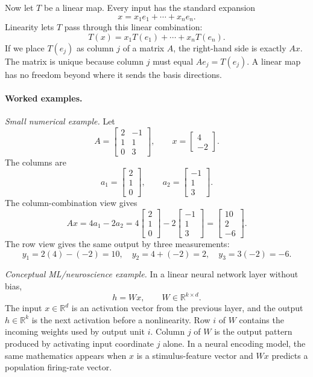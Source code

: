 Now let \(T\) be a linear map. Every input has the standard expansion
\[
x=x_1e_1+\cdots+x_ne_n.
\]
Linearity lets \(T\) pass through this linear combination:
\[
T(x)=x_1T(e_1)+\cdots+x_nT(e_n).
\]
If we place \(T(e_j)\) as column \(j\) of a matrix \(A\), the right-hand side is exactly \(Ax\). The matrix is unique because column \(j\) must equal \(Ae_j=T(e_j)\). A linear map has no freedom beyond where it sends the basis directions.

\paragraph{Worked examples.}
\emph{Small numerical example.} Let
\[
A=
\begin{bmatrix}
2 & -1\\
1 & 1\\
0 & 3
\end{bmatrix},
\qquad
x=\begin{bmatrix}4\\-2\end{bmatrix}.
\]
The columns are
\[
a_1=\begin{bmatrix}2\\1\\0\end{bmatrix},
\qquad
a_2=\begin{bmatrix}-1\\1\\3\end{bmatrix}.
\]
The column-combination view gives
\[
Ax=4a_1-2a_2
=
4\begin{bmatrix}2\\1\\0\end{bmatrix}
-2\begin{bmatrix}-1\\1\\3\end{bmatrix}
=
\begin{bmatrix}10\\2\\-6\end{bmatrix}.
\]
The row view gives the same output by three measurements:
\[
y_1=2(4)-(-2)=10,\quad
y_2=4+(-2)=2,\quad
y_3=3(-2)=-6.
\]

\emph{Conceptual ML/neuroscience example.} In a linear neural network layer without bias,
\[
h=Wx,
\qquad W\in\mathbb{R}^{k\times d}.
\]
The input \(x\in\mathbb{R}^d\) is an activation vector from the previous layer, and the output \(h\in\mathbb{R}^k\) is the next activation before a nonlinearity. Row \(i\) of \(W\) contains the incoming weights used by output unit \(i\). Column \(j\) of \(W\) is the output pattern produced by activating input coordinate \(j\) alone. In a neural encoding model, the same mathematics appears when \(x\) is a stimulus-feature vector and \(Wx\) predicts a population firing-rate vector.

